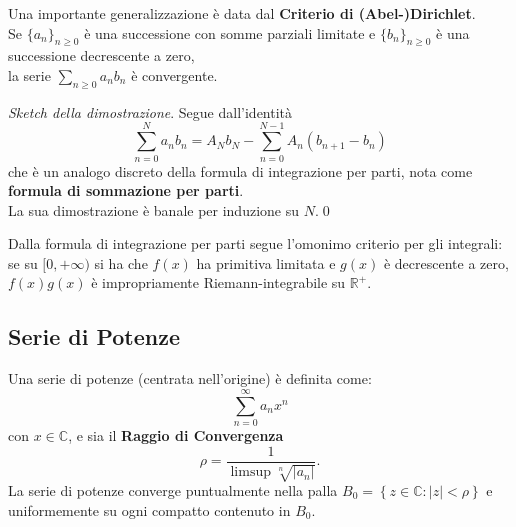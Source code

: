 \documentclass[a4paper,twoside]{article}
\newcommand{\C}{\mathbb{C}}
\newcommand{\R}{\mathbb{R}}
\theoremstyle{definition}
\numberwithin{theorem}{section}
\begin{document}
Una importante generalizzazione è data dal \textbf{Criterio di (Abel-)Dirichlet}.\\
Se $\{a_n\}_{n\geq 0}$ è una successione con somme parziali limitate e $\{b_n\}_{n\geq 0}$ è una successione decrescente a zero,\\ la serie $\sum_{n\geq 0}a_n b_n$ è convergente.

\emph{Sketch della dimostrazione}. Segue dall'identità
$$ \sum_{n=0}^{N}a_n b_n = A_N b_N - \sum_{n=0}^{N-1} A_n (b_{n+1}-b_n) $$
che è un analogo discreto della formula di integrazione per parti, nota come \textbf{formula di sommazione per parti}.\\ La sua dimostrazione è banale per induzione su $N$.\qed

Dalla formula di integrazione per parti segue l'omonimo criterio per gli integrali: se su $[0,+\infty)$ si ha che $f(x)$ ha primitiva limitata e $g(x)$ è decrescente a zero, $f(x)g(x)$ è impropriamente Riemann-integrabile su $\R^+$.

\subsection{Serie di Potenze}
Una serie di potenze (centrata nell'origine) è definita come:
$$\sum_{n=0}^{\infty}a_n x^n$$
con $x\in\C$, e sia il \textbf{Raggio di Convergenza} \\
$$\rho=\frac{1}{\limsup\sqrt[n]{|a_n|}}.$$
La serie di potenze converge puntualmente nella palla $B_0=\left\{z\in\C : |z|< \rho \right\}$ e uniformemente su ogni compatto contenuto in $B_0$.
\end{document}
